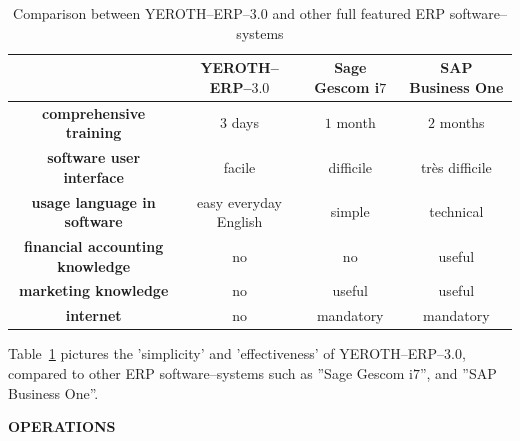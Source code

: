 \documentclass[12pt, a4paper]{article}
\newcommand{\yerotherp}{\textcolor{yerothColorBlue}{\sc YEROTH--ERP--$3.0$}\xspace}
\newcommand{\saperp}{SAP Business One\xspace}
\newcommand{\sageerp}{Sage Gescom i$7$\xspace}
\newcommand{\yerothvert}[1]{\textcolor{yerothColorGreen}{#1}\xspace}
\newcommand{\yerothorange}[1]{\textcolor{yerothColorOrange}{#1}\xspace}
\newcommand{\yerothrouge}[1]{\textcolor{yerothColorRed}{#1}\xspace}
\newcommand{\yerothfacile}{\yerothvert{facile}\xspace}
\newcommand{\yerothdifficile}{\yerothorange{difficile}\xspace}
\newcommand{\yerothtresdifficile}{\yerothrouge{tr\`es difficile}\xspace}
\begin{document}
\vspace{0.7cm}

\begin{table}[!htbp]
\centering
\begin{tabular}{cccc}

\multicolumn{1}{c}{}			&
\yerotherp 						& 
\sageerp						&
\saperp		\\ \hline

\textbf{comprehensive training}		&
		\yerothvert{$3$ days}			&
		\yerothorange{$1$ month}			&						
		\yerothrouge{$2$ months}			\\ \hline

\textbf{software user interface}		&
		\yerothfacile					&
		\yerothdifficile				&						
		\yerothtresdifficile				\\  \hline
		
\textbf{usage language in software}			&
		\yerothvert{easy everyday English}	&
		\yerothorange{simple}					&						
		\yerothrouge{technical}					\\ \hline			
		
\textbf{financial accounting knowledge}	&
		\yerothvert{no}		&
		\yerothvert{no}		&						
		\yerothorange{useful}	\\ \hline		

\textbf{marketing knowledge}	&
		\yerothvert{no}			&
		\yerothorange{useful}	&						
		\yerothorange{useful}	\\ \hline
		
\textbf{internet}				&
		\yerothvert{no}			&
		\yerothrouge{mandatory}	&						
		\yerothrouge{mandatory}	\\		
\end{tabular}
\caption{Comparison between \yerotherp and other full featured ERP software--systems\\}
\label{tab:comparison-against-others-erp-software-systems}
\end{table}

\vspace{0.5cm}

Table~\ref{tab:comparison-against-others-erp-software-systems}
pictures the 'simplicity' and 'effectiveness' of \yerotherp, 
compared to other ERP software--systems such as
''\sageerp'', and ''\saperp''.\\


\vspace{1cm}

{\large \bf OPERATIONS}

\vspace{0.75em}
\end{document}
